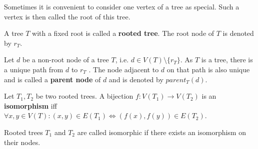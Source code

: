 Sometimes it is convenient to consider one vertex of a tree as special. Such a vertex is then called the root of this tree.

\begin{definition}
  A tree $T$ with a fixed root is called a  {\bf rooted tree}. The root node of $T$ is denoted by $r_T$.
\end{definition}

\begin{definition}
  Let $d$ be a non-root node of a tree $T$, i.e. $d\in V(T)\setminus \{r_T\}$. As $T$ is a tree, there is a unique path from $d$ to $r_T$ \cite{Diestel97Graphs}. The node adjacent to $d$ on that path is also unique and is called a {\bf parent node} of $d$ and is denoted by $parent_T(d)$.
\end{definition}

\begin{definition}
  Let $T_1, T_2$ be two rooted trees. A bijection $f: V(T_1)\rightarrow V(T_2)$ is an  {\bf isomorphism} iff $\forall x,y\in V(T): (x,y)\in E(T_1)\Leftrightarrow (f(x), f(y))\in E(T_2)$.
\end{definition}

Rooted trees $T_1$ and $T_2$ are called isomorphic if there exists an isomorphism on their nodes.
